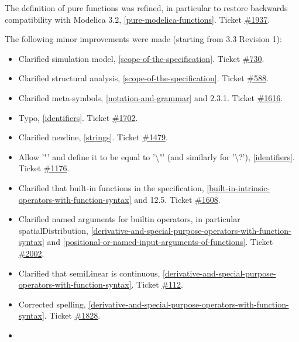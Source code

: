 The definition of pure functions was refined, in particular to restore
backwards compatibility with Modelica 3.2, \autoref{pure-modelica-functions}. Ticket
\href{https://trac.modelica.org/Modelica/ticket/1937}{\#1937}.

The following minor improvements were made (starting from 3.3 Revision
1):

\begin{itemize}
\item
  Clarified simulation model, \autoref{scope-of-the-specification}. Ticket
  \href{https://trac.modelica.org/Modelica/ticket/730}{\#730}.
\item
  Clarified structural analysis, \autoref{scope-of-the-specification}. Ticket
  \href{https://trac.modelica.org/Modelica/ticket/588}{\#588}.
\item
  Clarified meta-symbols, \autoref{notation-and-grammar} and 2.3.1. Ticket
  \href{https://trac.modelica.org/Modelica/ticket/1616}{\#1616}.
\item
  Typo, \autoref{identifiers}. Ticket
  \href{https://trac.modelica.org/Modelica/ticket/1702}{\#1702}.
\item
  Clarified newline, \autoref{strings}. Ticket
  \href{https://trac.modelica.org/Modelica/ticket/1479}{\#1479}.
\item
  Allow '"' and define it to be equal to '\textbackslash{}"' (and
  similarly for '\textbackslash{}?'), \autoref{identifiers}. Ticket
  \href{https://trac.modelica.org/Modelica/ticket/1176}{\#1176}.
\item
  Clarified that built-in functions in the specification, \autoref{built-in-intrinsic-operators-with-function-syntax}
  and 12.5. Ticket
  \href{https://trac.modelica.org/Modelica/ticket/1608}{\#1608}.
\item
  Clarified named arguments for builtin operators, in particular
  spatialDistribution, \autoref{derivative-and-special-purpose-operators-with-function-syntax} and \autoref{positional-or-named-input-arguments-of-functions}. Ticket
  \href{https://trac.modelica.org/Modelica/ticket/2002}{\#2002}.
\item
  Clarified that semiLinear is continuous, \autoref{derivative-and-special-purpose-operators-with-function-syntax}. Ticket
  \href{https://trac.modelica.org/Modelica/ticket/112}{\#112}.
\item
  Corrected spelling, \autoref{derivative-and-special-purpose-operators-with-function-syntax}. Ticket
  \href{https://trac.modelica.org/Modelica/ticket/1828}{\#1828}.
\item

\end{itemize}

